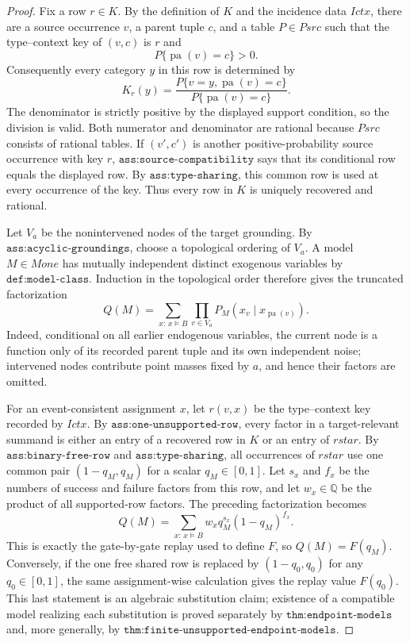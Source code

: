 \documentclass{article}
\begin{document}
\begin{proof}
Fix a row \(r\in K\).  By the definition of \(K\) and the incidence data \(Ictx\), there are a source occurrence \(v\), a parent tuple \(c\), and a table \(P\in Psrc\) such that the type--context key of \((v,c)\) is \(r\) and
\[
 P\{\operatorname{pa}(v)=c\}>0.
\]
Consequently every category \(y\) in this row is determined by
\[
 K_r(y)=
 \frac{P\{v=y,\operatorname{pa}(v)=c\}}
      {P\{\operatorname{pa}(v)=c\}}.
\]
The denominator is strictly positive by the displayed support condition, so the division is valid.  Both numerator and denominator are rational because \(Psrc\) consists of rational tables.  If \((v',c')\) is another positive-probability source occurrence with key \(r\), \(\texttt{ass:source-compatibility}\) says that its conditional row equals the displayed row.  By \(\texttt{ass:type-sharing}\), this common row is used at every occurrence of the key.  Thus every row in \(K\) is uniquely recovered and rational.

Let \(V_a\) be the nonintervened nodes of the target grounding.  By \(\texttt{ass:acyclic-groundings}\), choose a topological ordering of \(V_a\).  A model \(M\in Mone\) has mutually independent distinct exogenous variables by \(\texttt{def:model-class}\).  Induction in the topological order therefore gives the truncated factorization
\[
 Q(M)
 =\sum_{x:\,x\models B}
   \prod_{v\in V_a}
   P_M\!\left(x_v\mid x_{\operatorname{pa}(v)}\right).
\]
Indeed, conditional on all earlier endogenous variables, the current node is a function only of its recorded parent tuple and its own independent noise; intervened nodes contribute point masses fixed by \(a\), and hence their factors are omitted.

For an event-consistent assignment \(x\), let \(r(v,x)\) be the type--context key recorded by \(Ictx\).  By \(\texttt{ass:one-unsupported-row}\), every factor in a target-relevant summand is either an entry of a recovered row in \(K\) or an entry of \(rstar\).  By \(\texttt{ass:binary-free-row}\) and \(\texttt{ass:type-sharing}\), all occurrences of \(rstar\) use one common pair \((1-q_M,q_M)\) for a scalar \(q_M\in[0,1]\).  Let \(s_x\) and \(f_x\) be the numbers of success and failure factors from this row, and let \(w_x\in\mathbb Q\) be the product of all supported-row factors.  The preceding factorization becomes
\[
 Q(M)=\sum_{x:\,x\models B}
 w_x q_M^{s_x}(1-q_M)^{f_x}.
\]
This is exactly the gate-by-gate replay used to define \(F\), so \(Q(M)=F(q_M)\).  Conversely, if the one free shared row is replaced by \((1-q_0,q_0)\) for any \(q_0\in[0,1]\), the same assignment-wise calculation gives the replay value \(F(q_0)\).  This last statement is an algebraic substitution claim; existence of a compatible model realizing each substitution is proved separately by \(\texttt{thm:endpoint-models}\) and, more generally, by \(\texttt{thm:finite-unsupported-endpoint-models}\).


\end{proof}
\end{document}
